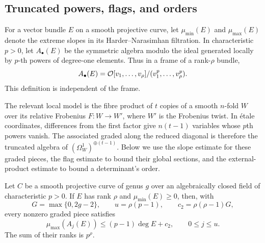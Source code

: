 \subsection{Truncated powers, flags, and orders}

For a vector bundle $E$ on a smooth projective curve, let
$\mu_{\min}(E)$ and $\mu_{\max}(E)$ denote the extreme slopes in
its Harder--Narasimhan filtration. In characteristic $p>0$, let
$A_\bullet(E)$ be the symmetric algebra modulo the ideal generated
locally by $p$-th powers of degree-one elements. Thus in a frame of
a rank-$\rho$ bundle,
\[
 A_\bullet(E)=\mathcal O[v_1,\ldots,v_\rho]/(v_1^p,\ldots,v_\rho^p).
\]
This definition is independent of the frame.

The relevant local model is the fibre product of $t$ copies of a
smooth $n$-fold $W$ over its relative Frobenius $F:W\to W'$, where
$W'$ is the Frobenius twist. In \'etale coordinates, differences
from the first factor give $n(t-1)$ variables whose $p$th powers vanish.
The associated graded along the reduced diagonal is therefore the
truncated algebra of $(\Omega_W^1)^{\oplus(t-1)}$. Below we use
the slope estimate for these graded pieces, the flag estimate to
bound their global sections, and the external-product estimate to
bound a determinant's order.

\begin{lemma}\label{lem:diag-slopes}
Let $C$ be a smooth projective curve of genus $g$ over an
algebraically closed field of characteristic $p>0$. If $E$ has rank
$\rho$ and $\mu_{\min}(E)\ge0$, then, with
\[
 G=\max\{0,2g-2\},\qquad
 u=\rho(p-1),\qquad c_2=\rho(\rho-1)G,
\]
every nonzero graded piece satisfies
\begin{equation}\label{eq:diag-truncated-slope}
 \mu_{\max}(A_j(E))\le(p-1)\deg E+c_2,
 \qquad 0\le j\le u.
\end{equation}
The sum of their ranks is $p^\rho$.
\end{lemma}

